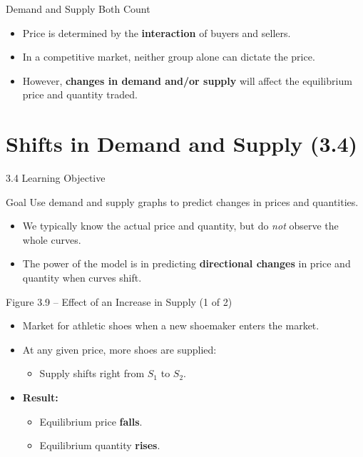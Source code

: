 \documentclass[aspectratio=169]{beamer}
\begin{document}
\begin{frame}{Demand and Supply Both Count}
\transfade
\begin{itemize}[<+->]
  \item Price is determined by the \textbf{interaction} of buyers and sellers.
  \item In a competitive market, neither group alone can dictate the price.
  \item However, \textbf{changes in demand and/or supply} will affect the equilibrium price and quantity traded.
\end{itemize}
\end{frame}

\section{Shifts in Demand and Supply (3.4)}

\begin{frame}{3.4 Learning Objective}
\transfade
\begin{block}{Goal}
Use demand and supply graphs to predict changes in prices and quantities.
\end{block}
\begin{itemize}[<+->]
  \item We typically know the actual price and quantity, but do \emph{not} observe the whole curves.
  \item The power of the model is in predicting \textbf{directional changes} in price and quantity when curves shift.
\end{itemize}
\end{frame}

\begin{frame}{Figure 3.9 -- Effect of an Increase in Supply (1 of 2)}
\transfade
\begin{itemize}[<+->]
  \item Market for athletic shoes when a new shoemaker enters the market.
  \item At any given price, more shoes are supplied:
  \begin{itemize}[<+->]
    \item Supply shifts right from \(S_1\) to \(S_2\).
  \end{itemize}
  \item \textbf{Result:}
  \begin{itemize}[<+->]
    \item Equilibrium price \textbf{falls}.
    \item Equilibrium quantity \textbf{rises}.
  \end{itemize}
\end{itemize}
\end{frame}
\end{document}

